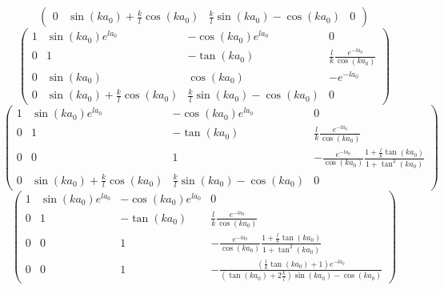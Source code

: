 \documentclass[12pt]{article}
\begin{document}
\begin{enumerate}
\[\begin{pmatrix}
                  0 & \sin{(k a_0)} + \frac{k}{l} \cos{(k a_0)} & \frac{k}{l}\sin{(k a_0)} - \cos{(k a_0)} & 0
              \end{pmatrix}
          \]
          \[
              \begin{pmatrix}
                  1 & \sin{(k a_0)}e^{l a_0}                    & -\cos{(k a_0)}e^{l a_0}                  & 0                                              \\
                  0 & 1                                         & -\tan{(k a_0)}                           & \frac{l}{k}  \frac{e^{- l a_0}}{\cos{(k a_0)}} \\
                  0 & \sin{(k a_0)}                             & \cos{(k a_0)}                            & - e^{-l a_0}                                   \\
                  0 & \sin{(k a_0)} + \frac{k}{l} \cos{(k a_0)} & \frac{k}{l}\sin{(k a_0)} - \cos{(k a_0)} & 0
              \end{pmatrix}
          \]
          \[
              \begin{pmatrix}
                  1 & \sin{(k a_0)}e^{l a_0}                    & -\cos{(k a_0)}e^{l a_0}                  & 0                                                                                           \\
                  0 & 1                                         & -\tan{(k a_0)}                           & \frac{l}{k}  \frac{e^{- l a_0}}{\cos{(k a_0)}}                                              \\
                  0 & 0                                         & 1                                        & - \frac{e^{-l a_0}}{\cos{(k a_0)}}\frac{1 + \frac{l}{k} \tan{(k a_0)}}{1 + \tan^2{(k a_0)}} \\
                  0 & \sin{(k a_0)} + \frac{k}{l} \cos{(k a_0)} & \frac{k}{l}\sin{(k a_0)} - \cos{(k a_0)} & 0
              \end{pmatrix}
          \]
          \[
              \begin{pmatrix}
                  1 & \sin{(k a_0)}e^{l a_0} & -\cos{(k a_0)}e^{l a_0} & 0                                                                                                                   \\
                  0 & 1                      & -\tan{(k a_0)}          & \frac{l}{k}  \frac{e^{- l a_0}}{\cos{(k a_0)}}                                                                      \\
                  0 & 0                      & 1                       & - \frac{e^{-l a_0}}{\cos{(k a_0)}}\frac{1 + \frac{l}{k} \tan{(k a_0)}}{1 + \tan^2{(k a_0)}}                         \\
                  0 & 0                      & 1                       & - \frac{(\frac{l}{k} \tan{(k a_0)} + 1) e^{- l a_0}}{(\tan{(k a_0)} + 2 \frac{k}{l}) \sin{(k a_0)} - \cos{(k a_0)}}
              \end{pmatrix}
          \]


\end{enumerate}
\end{document}
